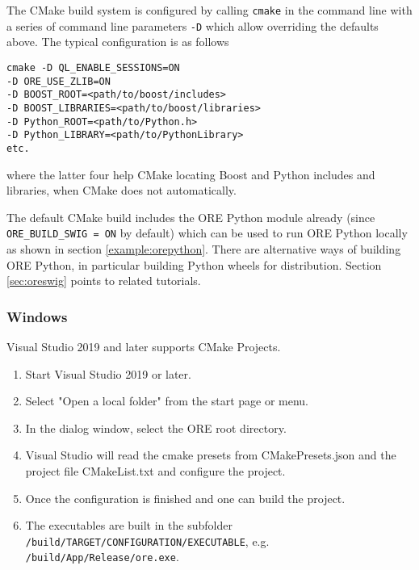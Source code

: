 The CMake build system is configured by calling {\tt cmake} in the command line with a series of
command line parameters {\tt -D} which allow overriding the defaults above.
The typical configuration is as follows

\medskip
    {\tt cmake -D QL\_ENABLE\_SESSIONS=ON \bs } \\
    \hspace{1cm} {\tt -D ORE\_USE\_ZLIB=ON \bs}  \\
    \hspace{1cm} {\tt -D BOOST\_ROOT=<path/to/boost/includes> \bs } \\
    \hspace{1cm} {\tt -D BOOST\_LIBRARIES=<path/to/boost/libraries> \bs } \\
    \hspace{1cm} {\tt -D Python\_ROOT=<path/to/Python.h> \bs } \\
    \hspace{1cm} {\tt -D Python\_LIBRARY=<path/to/PythonLibrary> } \\
    \hspace{1cm} {\tt etc.}

\medskip
where the latter four help CMake locating Boost and Python includes and libraries, when CMake does
not automatically.
  
\medskip
The default CMake build includes the ORE Python module already (since {\tt ORE\_BUILD\_SWIG = ON} by default) which can
be used to run ORE Python locally as shown in section \ref{example:orepython}.
There are alternative ways of building ORE Python, in particular building Python wheels for distribution.
Section \ref{sec:oreswig} points to related tutorials.

\subsubsection*{Windows}

Visual Studio 2019 and later supports CMake Projects.

\begin{enumerate}
\item Start Visual Studio 2019 or later.
\item Select "Open a local folder" from the start page or menu.
\item In the dialog window, select the ORE root directory.
\item Visual Studio will read the cmake presets from CMakePresets.json and the project file CMakeList.txt and configure the project.
\item Once the configuration is finished and one can build the project.
\item The executables are built in the subfolder {\tt /build/TARGET/CONFIGURATION/EXECUTABLE}, e.g. {\tt /build/App/Release/ore.exe}.
\end{enumerate}

